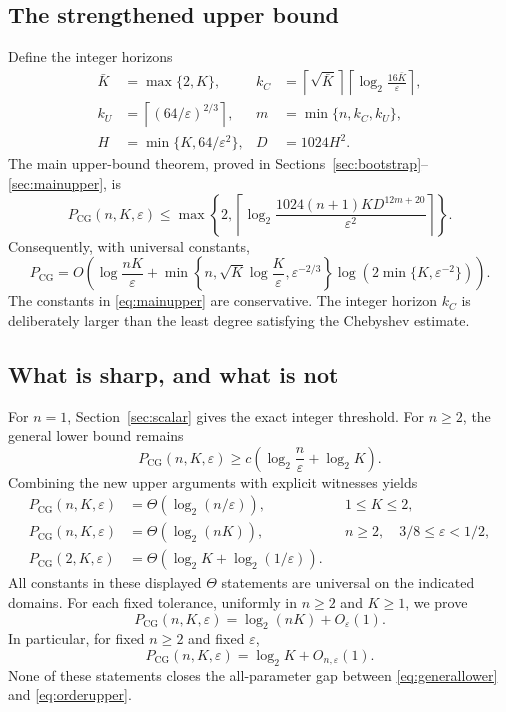 \documentclass[11pt]{article}
\theoremstyle{remark}\newtheorem{remark}[theorem]{Remark}
\newcommand{\PCG}{P_{\mathrm{CG}}}
\newcommand{\eps}{\varepsilon}
\begin{document}
\subsection{The strengthened upper bound}

Define the integer horizons
\begin{align}
\bar K&=\max\{2,K\},&
k_C&=\left\lceil\sqrt{\bar K}\right\rceil
      \left\lceil\log_2\frac{16\bar K}{\eps}\right\rceil,
\label{eq:kC}\\
k_U&=\left\lceil(64/\eps)^{2/3}\right\rceil,&
m&=\min\{n,k_C,k_U\},\label{eq:horizon}\\
H&=\min\{K,64/\eps^2\},&D&=1024H^2.\label{eq:HD}
\end{align}
The main upper-bound theorem, proved in Sections~\ref{sec:bootstrap}--\ref{sec:mainupper}, is
\begin{equation}\label{eq:mainupper}
\PCG(n,K,\eps)\le
\max\left\{2,\left\lceil\log_2
\frac{1024(n+1)K D^{12m+20}}{\eps^2}\right\rceil\right\}.
\end{equation}
Consequently, with universal constants,
\begin{equation}\label{eq:orderupper}
\PCG=O\!\left(
\log\frac{nK}{\eps}+
\min\!\left\{n,\sqrt K\log\frac K\eps,\eps^{-2/3}\right\}
\log\!\left(2\min\{K,\eps^{-2}\}\right)\right).
\end{equation}
The constants in \eqref{eq:mainupper} are conservative. The integer
horizon $k_C$ is deliberately larger than the least degree satisfying
the Chebyshev estimate.

\subsection{What is sharp, and what is not}

For $n=1$, Section~\ref{sec:scalar} gives the exact integer threshold.
For $n\ge2$, the general lower bound remains
\begin{equation}\label{eq:generallower}
\PCG(n,K,\eps)\ge c\left(\log_2\frac n\eps+\log_2K\right).
\end{equation}
Combining the new upper arguments with explicit witnesses yields
\begin{align}
\PCG(n,K,\eps)&=\Theta(\log_2(n/\eps)),&&1\le K\le2,
\label{eq:wellcond}\\
\PCG(n,K,\eps)&=\Theta(\log_2(nK)),&&n\ge2,\quad3/8\le\eps<1/2,
\label{eq:coarse}\\
\PCG(2,K,\eps)&=\Theta(\log_2K+\log_2(1/\eps)).
\label{eq:two}
\end{align}
All constants in these displayed $\Theta$ statements are universal on
the indicated domains. For each fixed tolerance, uniformly in $n\ge2$ and $K\ge1$, we prove
\begin{equation}\label{eq:fixedtol}
\PCG(n,K,\eps)=\log_2(nK)+O_{\eps}(1).
\end{equation}
In particular, for fixed $n\ge2$ and fixed $\eps$,
\begin{equation}\label{eq:largeK}
\PCG(n,K,\eps)=\log_2K+O_{n,\eps}(1).
\end{equation}
None of these statements closes the all-parameter gap between
\eqref{eq:generallower} and \eqref{eq:orderupper}.
\end{document}
